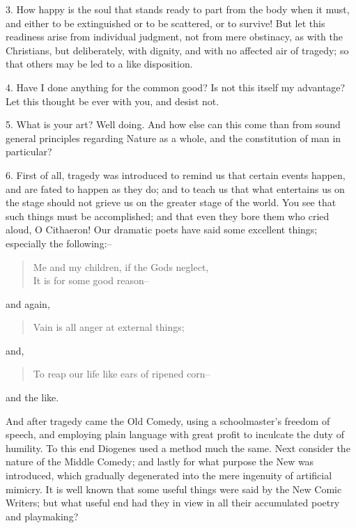 \documentclass{book}
\begin{document}
3. How happy is the soul that stands ready to part from the body when
it must, and either to be extinguished or to be scattered, or to
survive!  But let this readiness arise from individual judgment, not
from mere obstinacy, as with the Christians, but deliberately, with
dignity, and with no affected air of tragedy; so that others may be
led to a like disposition.

4. Have I done anything for the common good? Is not this itself my
advantage? Let this thought be ever with you, and desist not.

5. What is your art? Well doing. And how else can this come than from
sound general principles regarding Nature as a whole, and the
constitution of man in particular?

6. First of all, tragedy was introduced to remind us that certain
events happen, and are fated to happen as they do; and to teach us
that what entertains us on the stage should not grieve us on the
greater stage of the world. You see that such things must be
accomplished; and that even they bore them who cried aloud, O
Cithaeron! Our dramatic poets have said some excellent things;
especially the following:--

\begin{quote}
    Me and my children, if the Gods neglect, \\
    It is for some good reason--
\end{quote}

and again,

\begin{quote}
    Vain is all anger at external things;
\end{quote}

and,

\begin{quote}
    To reap our life like ears of ripened corn--
\end{quote}

and the like.

And after tragedy came the Old Comedy, using a schoolmaster's freedom
of speech, and employing plain language with great profit to inculcate
the duty of humility. To this end Diogenes used a method much the
same. Next consider the nature of the Middle Comedy; and lastly for
what purpose the New was introduced, which gradually degenerated into
the mere ingenuity of artificial mimicry. It is well known that some
useful things were said by the New Comic Writers; but what useful end
had they in view in all their accumulated poetry and playmaking?
\end{document}
